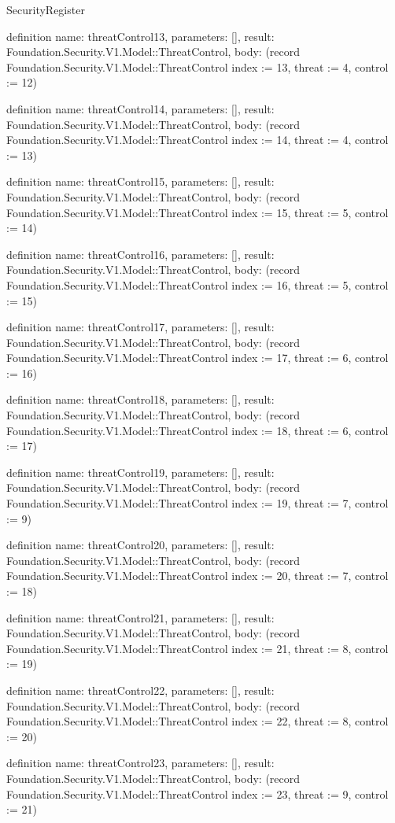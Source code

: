 \begin{lexlean}{SecurityRegister}
\begin{semanticmodule}
definition{
  name: threatControl13,
  parameters: [],
  result: Foundation.Security.V1.Model::ThreatControl,
  body: (record Foundation.Security.V1.Model::ThreatControl {index := 13, threat := 4, control := 12})
}

definition{
  name: threatControl14,
  parameters: [],
  result: Foundation.Security.V1.Model::ThreatControl,
  body: (record Foundation.Security.V1.Model::ThreatControl {index := 14, threat := 4, control := 13})
}

definition{
  name: threatControl15,
  parameters: [],
  result: Foundation.Security.V1.Model::ThreatControl,
  body: (record Foundation.Security.V1.Model::ThreatControl {index := 15, threat := 5, control := 14})
}

definition{
  name: threatControl16,
  parameters: [],
  result: Foundation.Security.V1.Model::ThreatControl,
  body: (record Foundation.Security.V1.Model::ThreatControl {index := 16, threat := 5, control := 15})
}

definition{
  name: threatControl17,
  parameters: [],
  result: Foundation.Security.V1.Model::ThreatControl,
  body: (record Foundation.Security.V1.Model::ThreatControl {index := 17, threat := 6, control := 16})
}

definition{
  name: threatControl18,
  parameters: [],
  result: Foundation.Security.V1.Model::ThreatControl,
  body: (record Foundation.Security.V1.Model::ThreatControl {index := 18, threat := 6, control := 17})
}

definition{
  name: threatControl19,
  parameters: [],
  result: Foundation.Security.V1.Model::ThreatControl,
  body: (record Foundation.Security.V1.Model::ThreatControl {index := 19, threat := 7, control := 9})
}

definition{
  name: threatControl20,
  parameters: [],
  result: Foundation.Security.V1.Model::ThreatControl,
  body: (record Foundation.Security.V1.Model::ThreatControl {index := 20, threat := 7, control := 18})
}

definition{
  name: threatControl21,
  parameters: [],
  result: Foundation.Security.V1.Model::ThreatControl,
  body: (record Foundation.Security.V1.Model::ThreatControl {index := 21, threat := 8, control := 19})
}

definition{
  name: threatControl22,
  parameters: [],
  result: Foundation.Security.V1.Model::ThreatControl,
  body: (record Foundation.Security.V1.Model::ThreatControl {index := 22, threat := 8, control := 20})
}

definition{
  name: threatControl23,
  parameters: [],
  result: Foundation.Security.V1.Model::ThreatControl,
  body: (record Foundation.Security.V1.Model::ThreatControl {index := 23, threat := 9, control := 21})
}


\end{semanticmodule}
\end{lexlean}

